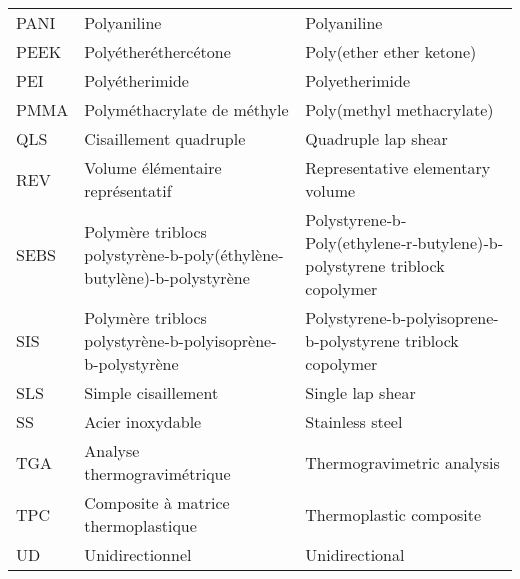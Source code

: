 \begin{longtable}{p{1in}>{\raggedright\arraybackslash}p{2.5in} p{2.45in}}
	PANI                  & Polyaniline                                                           & Polyaniline                                                              \\
	PEEK                  & Polyétheréthercétone                                                  & Poly(ether ether ketone)                                                 \\
	PEI                   & Polyétherimide                                                        & Polyetherimide                                                           \\
	PMMA                  & Polyméthacrylate de méthyle                                           & Poly(methyl methacrylate)                                                \\
	QLS                   & Cisaillement quadruple                                                & Quadruple lap shear                                                      \\
	REV                   & Volume élémentaire représentatif                                      & Representative elementary volume                                         \\
	SEBS                  & Polymère triblocs polystyrène-b-poly(éthylène-butylène)-b-polystyrène & Polystyrene‐b‐Poly(ethylene‐r‐butylene)‐b‐polystyrene triblock copolymer \\
	SIS                   & Polymère triblocs polystyrène-b-polyisoprène-b-polystyrène            & Polystyrene-b-polyisoprene-b-polystyrene triblock copolymer              \\
	SLS                   & Simple cisaillement                                                   & Single lap shear                                                         \\
	SS                    & Acier inoxydable                                                      & Stainless steel                                                          \\
	TGA                   & Analyse thermogravimétrique                                           & Thermogravimetric analysis                                               \\
	TPC                   & Composite à matrice thermoplastique                                   & Thermoplastic composite                                                  \\
	UD                    & Unidirectionnel                                                       & Unidirectional
\end{longtable}